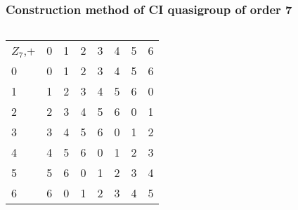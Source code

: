 \begin{frame}
\frametitle{Construction method of CI quasigroup of order 7}
\begin{columns}
	
	\begin{table}[]
		\begin{tabular}{llllllll}
			$Z_7$,+                 & 0                      & 1                      & 2                      & 3                      & 4                      & 5                      & 6                      \\ \cline{2-8} 
			\multicolumn{1}{l|}{0} & \multicolumn{1}{l|}{0} & \multicolumn{1}{l|}{1} & \multicolumn{1}{l|}{2} & \multicolumn{1}{l|}{3} & \multicolumn{1}{l|}{4} & \multicolumn{1}{l|}{5} & \multicolumn{1}{l|}{6} \\ \cline{2-8} 
			\multicolumn{1}{l|}{1} & \multicolumn{1}{l|}{1} & \multicolumn{1}{l|}{2} & \multicolumn{1}{l|}{3} & \multicolumn{1}{l|}{4} & \multicolumn{1}{l|}{5} & \multicolumn{1}{l|}{6} & \multicolumn{1}{l|}{0} \\ \cline{2-8} 
			\multicolumn{1}{l|}{2} & \multicolumn{1}{l|}{2} & \multicolumn{1}{l|}{3} & \multicolumn{1}{l|}{4} & \multicolumn{1}{l|}{5} & \multicolumn{1}{l|}{6} & \multicolumn{1}{l|}{0} & \multicolumn{1}{l|}{1} \\ \cline{2-8} 
			\multicolumn{1}{l|}{3} & \multicolumn{1}{l|}{3} & \multicolumn{1}{l|}{4} & \multicolumn{1}{l|}{5} & \multicolumn{1}{l|}{6} & \multicolumn{1}{l|}{0} & \multicolumn{1}{l|}{1} & \multicolumn{1}{l|}{2} \\ \cline{2-8} 
			\multicolumn{1}{l|}{4} & \multicolumn{1}{l|}{4} & \multicolumn{1}{l|}{5} & \multicolumn{1}{l|}{6} & \multicolumn{1}{l|}{0} & \multicolumn{1}{l|}{1} & \multicolumn{1}{l|}{2} & \multicolumn{1}{l|}{3} \\ \cline{2-8} 
			\multicolumn{1}{l|}{5} & \multicolumn{1}{l|}{5} & \multicolumn{1}{l|}{6} & \multicolumn{1}{l|}{0} & \multicolumn{1}{l|}{1} & \multicolumn{1}{l|}{2} & \multicolumn{1}{l|}{3} & \multicolumn{1}{l|}{4} \\ \cline{2-8} 
			\multicolumn{1}{l|}{6} & \multicolumn{1}{l|}{6} & \multicolumn{1}{l|}{0} & \multicolumn{1}{l|}{1} & \multicolumn{1}{l|}{2} & \multicolumn{1}{l|}{3} & \multicolumn{1}{l|}{4} & \multicolumn{1}{l|}{5} \\ \cline{2-8} 
		\end{tabular}
	\end{table}


\end{columns}
\end{frame}

